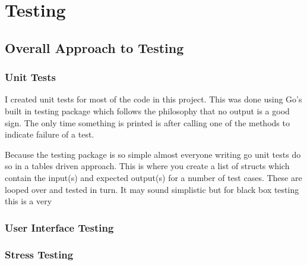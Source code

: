 \chapter{Testing}




\section{Overall Approach to Testing}

\subsection{Unit Tests}

I created unit tests for most of the code in this project.
This was done using Go's built in testing package which follows the philosophy that no output is a good sign. 
The only time something is printed is after calling one of the methods to indicate failure of a test.

Because the testing package is so simple almost everyone writing go unit tests do so in a tables driven approach.
This is where you create a list of structs which contain the input(s) and expected output(s) for a number of test cases.
These are looped over and tested in turn.
It may sound simplistic but for black box testing this is a very 

\subsection{User Interface Testing}

\subsection{Stress Testing}

